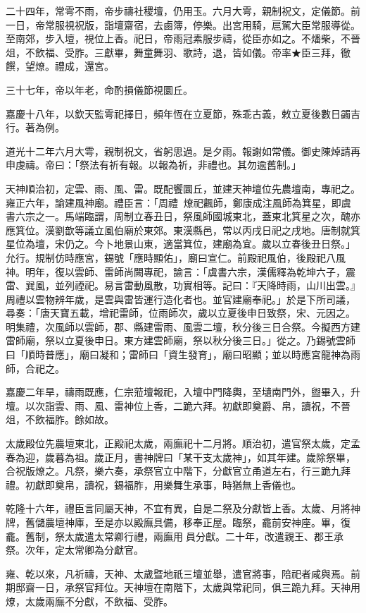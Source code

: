 \begin{pinyinscope}
二十四年，常雩不雨，帝步禱社稷壇，仍用玉。六月大雩，親制祝文，定儀節。前一日，帝常服視祝版，詣壇齋宿，去鹵簿，停樂。出宮用騎，扈駕大臣常服導從。至南郊，步入壇，視位上香。祀日，帝雨冠素服步禱，從臣亦如之。不燔柴，不晉俎，不飲福、受胙。三獻畢，舞童舞羽、歌詩，退，皆如儀。帝率★臣三拜，徹饌，望燎。禮成，還宮。

三十七年，帝以年老，命酌損儀節視圜丘。

嘉慶十八年，以欽天監雩祀擇日，頻年恆在立夏節，殊乖古義，敕立夏後數日蠲吉行。著為例。

道光十二年六月大雩，親制祝文，省躬思過。是夕雨。報謝如常儀。御史陳焯請再申虔禱。帝曰：「祭法有祈有報。以報為祈，非禮也。其勿逾舊制。」

天神順治初，定雲、雨、風、雷。既配饗圜丘，並建天神壇位先農壇南，專祀之。雍正六年，諭建風神廟。禮臣言：「周禮燎祀飌師，鄭康成注風師為箕星，即虞書六宗之一。馬端臨謂，周制立春丑日，祭風師國城東北，蓋東北箕星之次，醜亦應箕位。漢劉歆等議立風伯廟於東郊。東漢縣邑，常以丙戌日祀之戌地。唐制就箕星位為壇，宋仍之。今卜地景山東，適當箕位，建廟為宜。歲以立春後丑日祭。」允行。規制仿時應宮，錫號「應時顯佑」，廟曰宣仁。前殿祀風伯，後殿祀八風神。明年，復以雲師、雷師尚闕專祀，諭言：「虞書六宗，漢儒釋為乾坤六子，震雷、巽風，並列禋祀。易言雷動風散，功實相等。記曰：『天降時雨，山川出雲。』周禮以雲物辨年歲，是雲與雷皆運行造化者也。並官建廟奉祀。」於是下所司議，尋奏：「唐天寶五載，增祀雷師，位雨師次，歲以立夏後申日致祭，宋、元因之。明集禮，次風師以雲師，郡、縣建雷雨、風雲二壇，秋分後三日合祭。今擬西方建雷師廟，祭以立夏後申日。東方建雲師廟，祭以秋分後三日。」從之。乃錫號雲師曰「順時普應」，廟曰凝和；雷師曰「資生發育」，廟曰昭顯；並以時應宮龍神為雨師，合祀之。

嘉慶二年旱，禱雨既應，仁宗蒞壇報祀，入壇中門降輿，至壝南門外，盥畢入，升壇。以次詣雲、雨、風、雷神位上香，二跪六拜。初獻即奠爵、帛，讀祝，不晉俎，不飲福胙。餘如故。

太歲殿位先農壇東北，正殿祀太歲，兩廡祀十二月將。順治初，遣官祭太歲，定孟春為迎，歲暮為祖。歲正月，書神牌曰「某干支太歲神」，如其年建。歲除祭畢，合祝版燎之。凡祭，樂六奏，承祭官立中階下，分獻官立甬道左右，行三跪九拜禮。初獻即奠帛，讀祝，錫福胙，用樂舞生承事，時猶無上香儀也。

乾隆十六年，禮臣言同屬天神，不宜有異，自是二祭及分獻皆上香。太歲、月將神牌，舊儲農壇神庫，至是亦以殿廡具備，移奉正屋。臨祭，龕前安神座。畢，復龕。舊制，祭太歲遣太常卿行禮，兩廡用員分獻。二十年，改遣親王、郡王承祭。次年，定太常卿為分獻官。

雍、乾以來，凡祈禱，天神、太歲暨地祇三壇並舉，遣官將事，陪祀者咸與焉。前期邸齋一日，承祭官拜位。天神壇在南階下，太歲與常祀同，俱三跪九拜。天神用燎，太歲兩廡不分獻，不飲福、受胙。


\end{pinyinscope}
